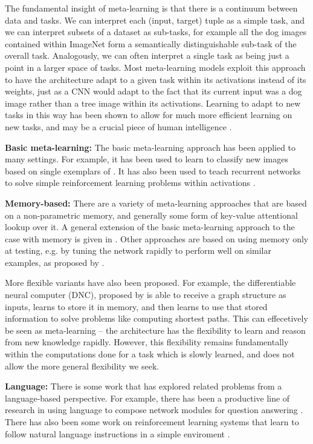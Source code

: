 \documentclass[11pt]{article}
\begin{document}
The fundamental insight of meta-learning is that there is a continuum between data and tasks. We can interpret each (input, target) tuple as a simple task, and we can interpret subsets of a dataset as sub-tasks, for example all the dog images contained within ImageNet form a semantically distinguishable sub-task of the overall task. Analogously, we can often interpret a single task as being just a point in a larger space of tasks. Most meta-learning models exploit this approach to have the architecture adapt to a given task within its activations instead of its weights, just as a CNN would adapt to the fact that its current input was a dog image rather than a tree image within its activations. Learning to adapt to new tasks in this way has been shown to allow for much more efficient learning on new tasks, and may be a crucial piece of human intelligence \citep{Hansen2017}. \par 
\textbf{Basic meta-learning:}
The basic meta-learning approach has been applied to many settings. For example, it has been used to learn to classify new images based on single exemplars of \citep{Vinyals2016}. It has also been used to teach recurrent networks to solve simple reinforcement learning problems within activations \citep{Duan2016, Wang2016a}. \par
\textbf{Memory-based:} There are a variety of meta-learning approaches that are based on a non-parametric memory, and generally some form of key-value attentional lookup over it. A general extension of the basic meta-learning approach to the case with memory is given in \citet{Santoro2016}. Other approaches are based on using memory only at testing, e.g. by tuning the network rapidly to perform well on similar examples, as proposed by \citet{Sprechmann2018}. \par 
More flexible variants have also been proposed. For example, the differentiable neural computer (DNC), proposed by \citet{Graves2016} is able to receive a graph structure as inputs, learns to store it in memory, and then learns to use that stored information to solve problems like computing shortest paths. This can effecetively be seen as meta-learning -- the architecture has the flexibility to learn and reason from new knowledge rapidly. However, this flexibility remains fundamentally within the computations done for a task which is slowly learned, and does not allow the more general flexibility we seek. \par
\textbf{Language:} There is some work that has explored related problems from a language-based perspective. For example, there has been a productive line of research in using language to compose network modules for question answering \citep{Andreas, Andreasa}. There has also been some work on reinforcement learning systems that learn to follow natural language instructions in a simple enviroment \citep{Hermann2017}. \par
\end{document}

